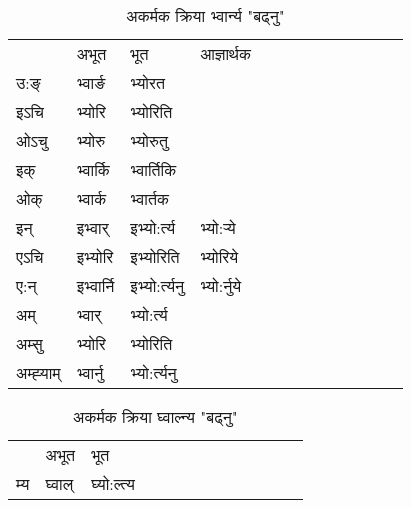 \begin{table}[H]
\centering
\caption{\label{or.vi} अकर्मक क्रिया  भ्वार्न्य  "बढ्नु"  }
\begin{tabular}{l|l|l|l|l|l|l|l|l|l|l|l|l}  \toprule
&अभूत & भूत & आज्ञार्थक \\ 
उ:ङ्‌ &भ्वार्ङ &भ्योरत \\ 
इऽचि &भ्योरि &भ्योरिति   \\ 
ओऽचु &भ्योरु &भ्योरुतु   \\ 
इक् &भ्वार्कि &भ्वार्तिकि   \\ 
ओक् &भ्वार्क &भ्वार्तक   \\ 
इन् & इभ्वार् & इभ्यो:र्त्य &भ्यो:र्‍ये  \\ 
एऽचि & इभ्योरि & इभ्योरिति &भ्योरिये    \\ 
ए:न् & इभ्वार्नि  & इभ्यो:र्त्यनु &भ्यो:र्नुये  \\ 
अम् & भ्वार् & भ्यो:र्त्य   \\ 
अम्सु & भ्योरि & भ्योरिति   \\ 
अम्ह्‍याम् & भ्वार्नु  & भ्यो:र्त्यनु \\ 
\bottomrule
\end{tabular}
\end{table}


\begin{table}[H]
\centering
\caption{\label{ol.vi} अकर्मक क्रिया  घ्वाल्न्य  "बढ्नु"  }
\begin{tabular}{l|l|l|l|l|l|l|l|l|l|l|l|l}  \toprule
&अभूत & भूत   \\ 
म्य & घ्वाल् & घ्यो:ल्त्य   \\ 
\bottomrule
\end{tabular}
\end{table}


